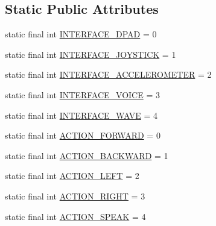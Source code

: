 \subsection*{Static Public Attributes}
\begin{DoxyCompactItemize}
\item 
static final int \hyperlink{interfacecom_1_1cellbots_1_1remote_1_1_ui_view_1_1_ui_event_listener_a6d81bc24a8b663de17aa4ebff1704928}{I\-N\-T\-E\-R\-F\-A\-C\-E\-\_\-\-D\-P\-A\-D} = 0
\item 
static final int \hyperlink{interfacecom_1_1cellbots_1_1remote_1_1_ui_view_1_1_ui_event_listener_a1c91944a7bf1cff6870c4814fe51909b}{I\-N\-T\-E\-R\-F\-A\-C\-E\-\_\-\-J\-O\-Y\-S\-T\-I\-C\-K} = 1
\item 
static final int \hyperlink{interfacecom_1_1cellbots_1_1remote_1_1_ui_view_1_1_ui_event_listener_aa72c2954af5a16547c6d9ccb4ecf9522}{I\-N\-T\-E\-R\-F\-A\-C\-E\-\_\-\-A\-C\-C\-E\-L\-E\-R\-O\-M\-E\-T\-E\-R} = 2
\item 
static final int \hyperlink{interfacecom_1_1cellbots_1_1remote_1_1_ui_view_1_1_ui_event_listener_ab7a89ffa7a4d961d8424f571f93b1593}{I\-N\-T\-E\-R\-F\-A\-C\-E\-\_\-\-V\-O\-I\-C\-E} = 3
\item 
static final int \hyperlink{interfacecom_1_1cellbots_1_1remote_1_1_ui_view_1_1_ui_event_listener_af5bdc525e0470c6664092a4e2f601c89}{I\-N\-T\-E\-R\-F\-A\-C\-E\-\_\-\-W\-A\-V\-E} = 4
\item 
static final int \hyperlink{interfacecom_1_1cellbots_1_1remote_1_1_ui_view_1_1_ui_event_listener_a6aabaa5dc43aab6a7ec58d6bf30fd562}{A\-C\-T\-I\-O\-N\-\_\-\-F\-O\-R\-W\-A\-R\-D} = 0
\item 
static final int \hyperlink{interfacecom_1_1cellbots_1_1remote_1_1_ui_view_1_1_ui_event_listener_aa3e7d7712f6b311d9d7f27c4406650cc}{A\-C\-T\-I\-O\-N\-\_\-\-B\-A\-C\-K\-W\-A\-R\-D} = 1
\item 
static final int \hyperlink{interfacecom_1_1cellbots_1_1remote_1_1_ui_view_1_1_ui_event_listener_a446f93e0fd8af0f88c31f442149c6eed}{A\-C\-T\-I\-O\-N\-\_\-\-L\-E\-F\-T} = 2
\item 
static final int \hyperlink{interfacecom_1_1cellbots_1_1remote_1_1_ui_view_1_1_ui_event_listener_ac913f8b66d593ab500ff17b75bcaad21}{A\-C\-T\-I\-O\-N\-\_\-\-R\-I\-G\-H\-T} = 3
\item 
static final int \hyperlink{interfacecom_1_1cellbots_1_1remote_1_1_ui_view_1_1_ui_event_listener_ada0499e59b85a2753fd9b3058a9d29e8}{A\-C\-T\-I\-O\-N\-\_\-\-S\-P\-E\-A\-K} = 4
\item 

\end{DoxyCompactItemize}
